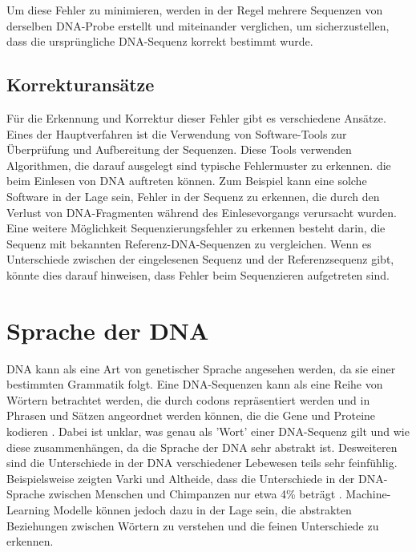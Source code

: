 \documentclass[oneside,bibliography=totocnumbered,BCOR=5mm]{scrbook}%
\theoremstyle{definition}
\theoremstyle{definition}
\theoremstyle{definition}
\theoremstyle{definition}
\theoremstyle{definition}
\theoremstyle{definition}
\begin{document}
Um diese Fehler zu minimieren, werden in der Regel mehrere Sequenzen von derselben DNA-Probe erstellt und miteinander verglichen, 
um sicherzustellen, dass die ursprüngliche DNA-Sequenz korrekt bestimmt wurde.\\
\linebreak[4]


\subsection{Korrekturansätze}


Für die Erkennung und Korrektur dieser Fehler gibt es verschiedene Ansätze. Eines der Hauptverfahren ist die Verwendung von Software-Tools zur Überprüfung und Aufbereitung der Sequenzen. 
Diese Tools verwenden Algorithmen, die darauf ausgelegt sind typische Fehlermuster zu erkennen. 
die beim Einlesen von DNA auftreten können. 
Zum Beispiel kann eine solche Software in der Lage sein, Fehler in der Sequenz zu erkennen, 
die durch den Verlust von DNA-Fragmenten während des Einlesevorgangs verursacht wurden.  \\


Eine weitere Möglichkeit Sequenzierungsfehler zu erkennen
besteht darin, die Sequenz mit bekannten Referenz-DNA-Sequenzen zu vergleichen.
Wenn es Unterschiede zwischen der eingelesenen Sequenz und der Referenzsequenz gibt, 
könnte dies darauf hinweisen, dass Fehler beim Sequenzieren aufgetreten sind. \\
\linebreak[4]


\section{Sprache der DNA}


DNA kann als eine Art von genetischer Sprache angesehen werden, da sie einer bestimmten Grammatik folgt. 
Eine DNA-Sequenzen kann als eine Reihe von Wörtern betrachtet werden, 
die durch codons repräsentiert werden und in Phrasen und Sätzen angeordnet werden können, 
die die Gene und Proteine kodieren \autocite[Seite 584]{dnalinguistic}. Dabei ist unklar, 
was genau als 'Wort' einer DNA-Sequenz gilt und wie diese zusammenhängen, da die Sprache der 
DNA sehr abstrakt ist. Desweiteren sind die Unterschiede in der DNA verschiedener Lebewesen
teils sehr feinfühlig. Beispielsweise zeigten Varki und Altheide, dass die Unterschiede in
der DNA-Sprache zwischen Menschen und Chimpanzen nur etwa 4\% beträgt \autocite[Seite 1748]{genomeDifference}.
Machine-Learning Modelle können jedoch dazu in der Lage sein, die abstrakten 
Beziehungen zwischen Wörtern zu verstehen und die feinen Unterschiede zu erkennen. \\
\end{document}

